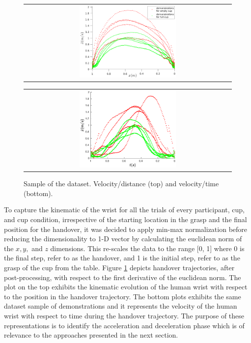     \begin{figure}
        \centering
        \begin{tabular}{@{}c@{}}
            \centering
            \includegraphics[width=0.48\textwidth,height=0.25\textheight]{Images/vel_distance_plot.eps}
        \end{tabular}
        \baselineskip
        \begin{tabular}{@{}c@{}}
            \centering 
            \includegraphics[width=0.48\textwidth,height=0.25\textheight]{Images/vel_time_plot.eps}
        \end{tabular}
        \caption{Sample of the dataset. Velocity/distance (top) and velocity/time (bottom).}
        \label{fig:vel_distance_time}
    \end{figure}

To capture the kinematic of the wrist for all the trials of every participant, cup, and cup condition, irrespective of the starting location in the grasp and the final position for the handover, it was decided to apply min-max normalization before reducing the dimensionality to 1-D vector by calculating the euclidean norm of the $x, y,$ and $z$ dimensions. This re-scales the data to the range [0, 1] where 0 is the final step, refer to as the handover, and 1 is the initial step, refer to as the grasp of the cup from the table. Figure \ref{fig:vel_distance_time} depicts handover trajectories, after post-processing, with respect to the first derivative of the euclidean norm. The plot on the top exhibits the kinematic evolution of the human wrist with respect to the position in the handover trajectory. The bottom plots exhibits the same dataset sample of demonstrations and it represents the velocity of the human wrist with respect to time during the handover trajectory. The purpose of these representations is to identify the acceleration and deceleration phase which is of relevance to the approaches presented in the next section. 

